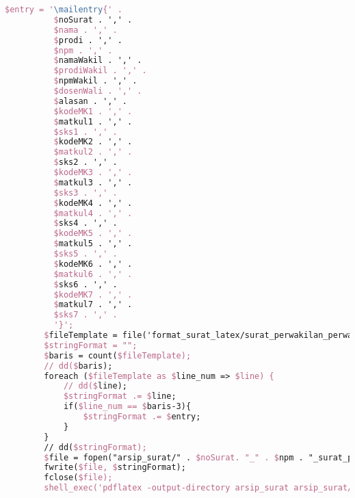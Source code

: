 \begin{lstlisting}[language=tex,basicstyle=\tiny,caption=HistorysuratController.php]
        $entry = '\mailentry{' .
          $noSurat . ',' .
          $nama . ',' .
          $prodi . ',' .
          $npm . ',' .
          $namaWakil . ',' .
          $prodiWakil . ',' .
          $npmWakil . ',' .
          $dosenWali . ',' .
          $alasan . ',' .
          $kodeMK1 . ',' .
          $matkul1 . ',' .
          $sks1 . ',' .
          $kodeMK2 . ',' .
          $matkul2 . ',' .
          $sks2 . ',' .
          $kodeMK3 . ',' .
          $matkul3 . ',' .
          $sks3 . ',' .
          $kodeMK4 . ',' .
          $matkul4 . ',' .
          $sks4 . ',' .
          $kodeMK5 . ',' .
          $matkul5 . ',' .
          $sks5 . ',' .
          $kodeMK6 . ',' .
          $matkul6 . ',' .
          $sks6 . ',' .
          $kodeMK7 . ',' .
          $matkul7 . ',' .
          $sks7 . ',' .
          '}';
        $fileTemplate = file('format_surat_latex/surat_perwakilan_perwalian_7mk.tex');
        $stringFormat = "";
        $baris = count($fileTemplate);
        // dd($baris);
        foreach ($fileTemplate as $line_num => $line) {
            // dd($line);
            $stringFormat .= $line;
            if($line_num == $baris-3){
                $stringFormat .= $entry;
            }
        }
        // dd($stringFormat);
        $file = fopen("arsip_surat/" . $noSurat. "_" . $npm . "_surat_perwakilan_perwalian_7mk.tex", "w");
        fwrite($file, $stringFormat);
        fclose($file);
        shell_exec('pdflatex -output-directory arsip_surat arsip_surat/' . $noSurat . '_' . $npm . '_surat_perwakilan_perwalian_7mk.tex');


\end{lstlisting}
